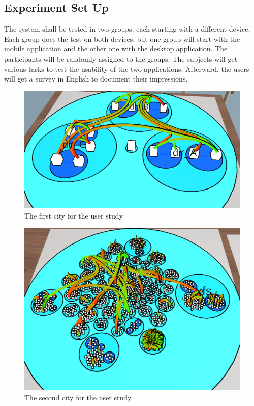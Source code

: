 \subsection{Experiment Set Up}
\label{experiment}
The system shall be tested in two groups, each starting with a different device.
Each group does the test on both devices, but one group will start with the mobile application and the other one with the desktop application.
The participants will be randomly assigned to the groups.
The subjects will get various tasks to test the \gls{usability} of the two applications.
Afterward, the users will get a survey in English to document their impressions.
\begin{figure}[H]
  \centering
  \includegraphics[width=1\textwidth]{Evaluation/img/city_1.png}
  \caption{The first \gls{city} for the user study}\label{fig:city1}
\end{figure}

\begin{figure}[H]
  \centering
  \includegraphics[width=1\textwidth]{Evaluation/img/city_2.png}
  \caption{The second \gls{city} for the user study}\label{fig:city2}
\end{figure}

